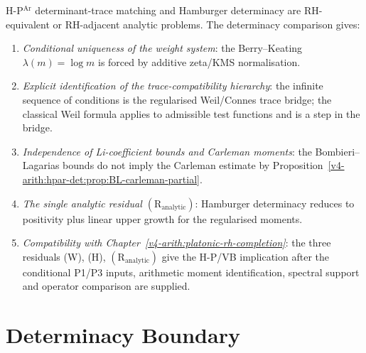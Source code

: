 \begin{remark}
\label{v4-arith:hpar-det:rem:wave3-contribution}
H-P\(^{\mathrm{Ar}}\) determinant-trace matching and Hamburger determinacy
are RH-equivalent or RH-adjacent analytic problems. The determinacy
comparison gives:
\begin{enumerate}
\item \emph{Conditional uniqueness of the weight system}:
the Berry--Keating \(\lambda(m)=\log m\) is forced by additive
zeta/KMS normalisation.
\item \emph{Explicit identification of the trace-compatibility
hierarchy}: the infinite sequence of conditions is the regularised
Weil/Connes trace bridge; the classical Weil formula applies
to admissible test functions and is a step in the bridge.
\item \emph{Independence of Li-coefficient bounds and Carleman
moments}: the Bombieri--Lagarias bounds do not imply the Carleman
estimate by Proposition~\ref{v4-arith:hpar-det:prop:BL-carleman-partial}.
\item \emph{The single analytic residual
\((\mathrm{R}_{\mathrm{analytic}})\)}: Hamburger determinacy reduces
to positivity plus linear upper growth for the regularised moments.
\item \emph{Compatibility with Chapter~\ref{v4-arith:platonic-rh-completion}}: the three residuals (W), (H),
\((\mathrm{R}_{\mathrm{analytic}})\) give the H-P/VB implication after
the conditional P1/P3 inputs, arithmetic moment identification,
spectral support and operator comparison are supplied.
\end{enumerate}
\end{remark}

\section{Determinacy Boundary}
\label{v4-arith:hpar-det:summary}

